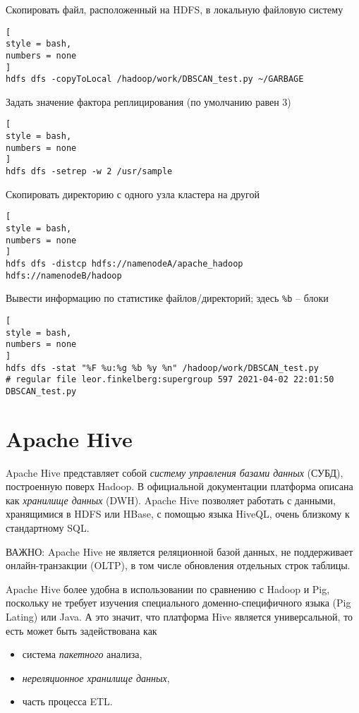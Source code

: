 \documentclass[%
	11pt,
	a4paper,
	utf8,
		]{article}
\begin{document}
Скопировать файл, расположенный на HDFS, в локальную файловую систему
\begin{lstlisting}[
style = bash,
numbers = none	
]
hdfs dfs -copyToLocal /hadoop/work/DBSCAN_test.py ~/GARBAGE
\end{lstlisting}

Задать значение фактора реплицирования (по умолчанию равен 3)
\begin{lstlisting}[
style = bash,
numbers = none	
]
hdfs dfs -setrep -w 2 /usr/sample
\end{lstlisting}

Скопировать директорию с одного узла кластера на другой
\begin{lstlisting}[
style = bash,
numbers = none	
]
hdfs dfs -distcp hdfs://namenodeA/apache_hadoop hdfs://namenodeB/hadoop
\end{lstlisting}

Вывести информацию по статистике файлов/директорий; здесь \verb|%b| -- блоки
\begin{lstlisting}[
style = bash,
numbers = none	
]
hdfs dfs -stat "%F %u:%g %b %y %n" /hadoop/work/DBSCAN_test.py
# regular file leor.finkelberg:supergroup 597 2021-04-02 22:01:50 DBSCAN_test.py
\end{lstlisting}


\section{Apache Hive}

Apache Hive представляет собой \emph{систему управления базами данных} (СУБД), построенную поверх Hadoop. В официальной документации платформа описана как \emph{хранилище данных} (DWH). Apache Hive позволяет работать с данными, хранящимися в HDFS или HBase, с помощью языка HiveQL, очень близкому к стандартному SQL.

ВАЖНО: Apache Hive не является реляционной базой данных, не поддерживает онлайн-транзакции (OLTP), в том числе обновления отдельных строк таблицы.

Apache Hive более удобна в использовании по сравнению с Hadoop и Pig, поскольку не требует изучения специального доменно-специфичного языка (Pig Lating) или Java. А это значит, что платформа Hive является универсальной, то есть может быть задействована как
\begin{itemize}
	\item система \emph{пакетного} анализа,
	
	\item \emph{нереляционное хранилище данных},
	
	\item часть процесса ETL.
\end{itemize}
\end{document}
